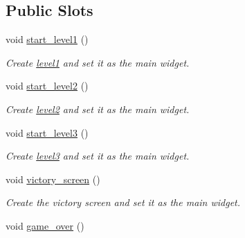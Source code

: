 \subsection*{Public Slots}
\begin{DoxyCompactItemize}
\item 
void \hyperlink{class_main_window_a0416fa37103aeb873f99c3c90f401f6f}{start\+\_\+level1} ()\hypertarget{class_main_window_a0416fa37103aeb873f99c3c90f401f6f}{}\label{class_main_window_a0416fa37103aeb873f99c3c90f401f6f}

\begin{DoxyCompactList}\small\item\em Create \hyperlink{classlevel1}{level1} and set it as the main widget. \end{DoxyCompactList}\item 
void \hyperlink{class_main_window_abba367075f5c8e11fdc9e531c55ef4e3}{start\+\_\+level2} ()\hypertarget{class_main_window_abba367075f5c8e11fdc9e531c55ef4e3}{}\label{class_main_window_abba367075f5c8e11fdc9e531c55ef4e3}

\begin{DoxyCompactList}\small\item\em Create \hyperlink{classlevel2}{level2} and set it as the main widget. \end{DoxyCompactList}\item 
void \hyperlink{class_main_window_a0be57e220676b7ff32fee2b9bd4dd8e8}{start\+\_\+level3} ()\hypertarget{class_main_window_a0be57e220676b7ff32fee2b9bd4dd8e8}{}\label{class_main_window_a0be57e220676b7ff32fee2b9bd4dd8e8}

\begin{DoxyCompactList}\small\item\em Create \hyperlink{classlevel3}{level3} and set it as the main widget. \end{DoxyCompactList}\item 
void \hyperlink{class_main_window_a982e9b59ebe751fe6b1aac349309a51f}{victory\+\_\+screen} ()\hypertarget{class_main_window_a982e9b59ebe751fe6b1aac349309a51f}{}\label{class_main_window_a982e9b59ebe751fe6b1aac349309a51f}

\begin{DoxyCompactList}\small\item\em Create the victory screen and set it as the main widget. \end{DoxyCompactList}\item 
void \hyperlink{class_main_window_ad095804e948ea80ebaa1311858700ded}{game\+\_\+over} ()\hypertarget{class_main_window_ad095804e948ea80ebaa1311858700ded}{}\label{class_main_window_ad095804e948ea80ebaa1311858700ded}


\end{DoxyCompactItemize}
